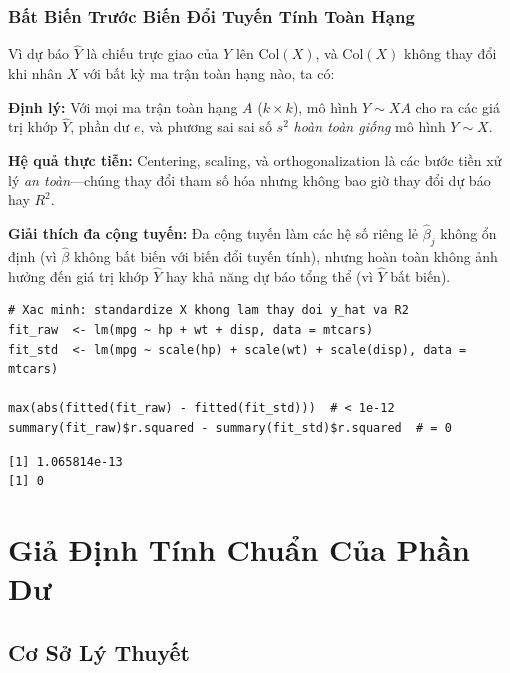 \documentclass[12pt, a4paper]{article}
\begin{document}
\subsubsection{Bất Biến Trước Biến Đổi Tuyến Tính Toàn Hạng}

Vì dự báo $\hat{Y}$ là chiếu trực giao của $Y$ lên $\mathrm{Col}(X)$, và $\mathrm{Col}(X)$ không thay đổi khi nhân $X$ với bất kỳ ma trận toàn hạng nào, ta có:

\textbf{Định lý:} Với mọi ma trận toàn hạng $A$ ($k \times k$), mô hình $Y \sim XA$ cho ra các giá trị khớp $\hat{Y}$, phần dư $e$, và phương sai sai số $s^2$ \textit{hoàn toàn giống} mô hình $Y \sim X$.

\textbf{Hệ quả thực tiễn:} Centering, scaling, và orthogonalization là các bước tiền xử lý \textit{an toàn}---chúng thay đổi tham số hóa nhưng không bao giờ thay đổi dự báo hay $R^2$.

\textbf{Giải thích đa cộng tuyến:} Đa cộng tuyến làm các hệ số riêng lẻ $\hat{\beta}_j$ không ổn định (vì $\hat{\beta}$ không bất biến với biến đổi tuyến tính), nhưng hoàn toàn không ảnh hưởng đến giá trị khớp $\hat{Y}$ hay khả năng dự báo tổng thể (vì $\hat{Y}$ bất biến).

\begin{lstlisting}[style=Rstyle]
# Xac minh: standardize X khong lam thay doi y_hat va R2
fit_raw  <- lm(mpg ~ hp + wt + disp, data = mtcars)
fit_std  <- lm(mpg ~ scale(hp) + scale(wt) + scale(disp), data = mtcars)

max(abs(fitted(fit_raw) - fitted(fit_std)))  # < 1e-12
summary(fit_raw)$r.squared - summary(fit_std)$r.squared  # = 0
\end{lstlisting}

\begin{lstlisting}[style=output]
[1] 1.065814e-13
[1] 0
\end{lstlisting}

\section{Giả Định Tính Chuẩn Của Phần Dư}

\subsection{Cơ Sở Lý Thuyết}
\end{document}
